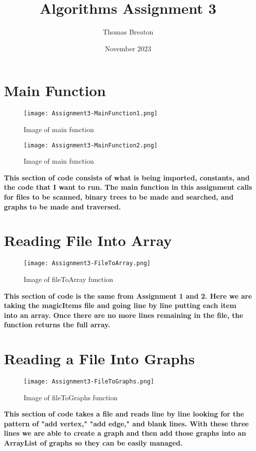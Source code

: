 \documentclass{article}
\title{Algorithms Assignment 3}
\author{Thomas Breaton}
\date{November 2023}
\begin{document}
\maketitle

\section{Main Function}
\begin{figure}[h]
    \centering
    \texttt{[image: Assignment3-MainFunction1.png]}
    \caption{Image of main function}
    \label{fig:mainFunction1}
\end{figure}
\begin{figure}[h]
    \centering
    \texttt{[image: Assignment3-MainFunction2.png]}
    \caption{Image of main function}
    \label{fig:mainFunction2}
\end{figure}
\newpage
\textbf{This section of code consists of what is being imported, constants, and the code that I want to run. The main function in this assignment calls for files to be scanned, binary trees to be made and searched, and graphs to be made and traversed.}
\newpage

\section{Reading File Into Array}
\begin{figure}[h]
    \centering
    \texttt{[image: Assignment3-FileToArray.png]}
    \caption{Image of fileToArray function}
    \label{fig:filetoArray}
\end{figure}
\textbf{This section of code is the same from Assignment 1 and 2. Here we are taking the magicItems file and going line by line putting each item into an array. Once there are no more lines remaining in the file, the function returns the full array.}
\newpage

\section{Reading a File Into Graphs}
\begin{figure}[h]
    \centering
    \texttt{[image: Assignment3-FileToGraphs.png]}
    \caption{Image of fileToGraphs function}
    \label{fig:filetoGraphs}
\end{figure}
\textbf{This section of code takes a file and reads line by line looking for the pattern of "add vertex," "add edge," and blank lines. With these three lines we are able to create a graph and then add those graphs into an ArrayList of graphs so they can be easily managed.}
\newpage
\end{document}
